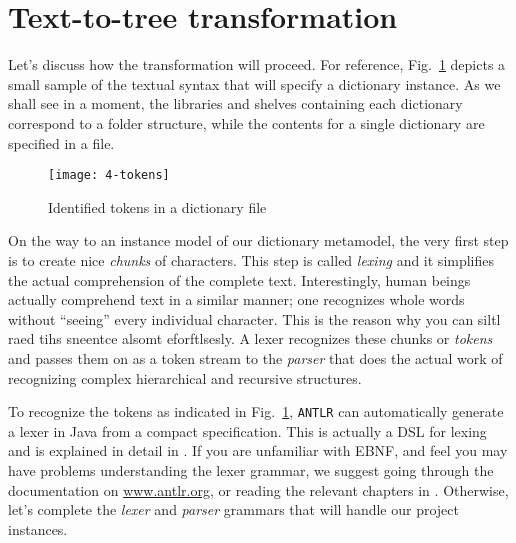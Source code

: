 \newpage
\section{Text-to-tree transformation}
\genHeader

Let's discuss how the transformation will proceed. For reference, Fig.~\ref{fig:moca-4-Tokens} depicts a small sample of the textual syntax that will specify
a dictionary instance. As we shall see in a moment, the libraries and shelves containing each dictionary correspond to a folder structure, while the
contents for a single dictionary are specified in a file.

\begin{figure}[!htbp]
\begin{center}
 \texttt{[image: 4-tokens]}
  \caption{Identified tokens in a dictionary file}
  \label{fig:moca-4-Tokens}
\end{center}
\end{figure}

On the way to an instance model of our dictionary metamodel, the very first step is to create nice \emph{chunks} of characters. This step is called
\emph{lexing} and it simplifies the actual comprehension of the complete text. Interestingly, human beings actually comprehend text in a similar manner; one
recognizes whole words without ``seeing'' every individual character. This is the reason why you can siltl raed tihs sneentce alsomt eforftlsesly. A lexer
recognizes these chunks or \emph{tokens} and passes them on as a token stream to the \emph{parser} that does the actual work of recognizing complex
hierarchical and recursive structures.
   
To recognize the tokens as indicated in Fig.~\ref{fig:moca-4-Tokens}, \texttt{ANTLR} can automatically generate a lexer in Java from a compact specification.
This is actually a DSL for lexing and is explained in detail in \cite{ANTLR}. If you are unfamiliar with EBNF, and feel you may have problems understanding
the lexer grammar, we suggest going through the documentation on \url{www.antlr.org}, or reading the relevant chapters in \cite{ANTLR}. Otherwise, let's
complete the \emph{lexer} and \emph{parser} grammars that will handle our project instances.

